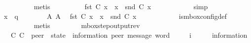 \begin{isabellebody}
\ \ \ \ \ \ \ \ \isamarkupfalse%
\ metis\isanewline
\ \ \ \ \ \ \isamarkupfalse%
\ \isamarkupfalse%
\ {\isachardoublequoteopen}fst\ {\isacharparenleft}{\kern0pt}C{}\ x{\isacharparenright}{\kern0pt}\ {\isasymin}\ {\isasymS}{\isacharparenleft}{\kern0pt}x{\isacharparenright}{\kern0pt}\ {\isasymand}\ snd\ {\isacharparenleft}{\kern0pt}C{}\ x{\isacharparenright}{\kern0pt}\ {\isasymin}\ {\isasymM}\isactrlsup {\isacharasterisk}{\kern0pt}{\isachardoublequoteclose}\isanewline
\ \ \ \ \ \ \ \ \isamarkupfalse%
\ simp\isanewline
\ \ \ \ \isamarkupfalse%
\isanewline
\ \ \ \ \ \ \isamarkupfalse%
\ {\isachardoublequoteopen}x\ {\isasymnoteq}\ q{\isachardoublequoteclose}\isanewline
\ \ \ \ \ \ \isamarkupfalse%
\ A{}\ A{}\ \isamarkupfalse%
\ {\isachardoublequoteopen}fst\ {\isacharparenleft}{\kern0pt}C{}\ x{\isacharparenright}{\kern0pt}\ {\isasymin}\ {\isasymS}{\isacharparenleft}{\kern0pt}x{\isacharparenright}{\kern0pt}\ {\isasymand}\ snd\ {\isacharparenleft}{\kern0pt}C{}\ x{\isacharparenright}{\kern0pt}\ {\isasymin}\ {\isasymM}\isactrlsup {\isacharasterisk}{\kern0pt}{\isachardoublequoteclose}\isanewline
\ \ \ \ \ \ \ \ \isamarkupfalse%
\ is{\isacharunderscore}{\kern0pt}mbox{\isacharunderscore}{\kern0pt}config{\isacharunderscore}{\kern0pt}def\isanewline
\ \ \ \ \ \ \ \ \isamarkupfalse%
\ metis\isanewline
\ \ \ \ \isamarkupfalse%
\isanewline
\ \ \isamarkupfalse%
\isanewline
{}\isamarkupfalse%
%
\endisatagproof
{\isafoldproof}%
%
\isadelimproof
\isanewline
%
\endisadelimproof
\isanewline
{}\isamarkupfalse%
\ mbox{\isacharunderscore}{\kern0pt}step{\isacharunderscore}{\kern0pt}output{\isacharunderscore}{\kern0pt}rev{\isacharcolon}{\kern0pt}\isanewline
\ \ \ C{}\ C{}\ {\isacharcolon}{\kern0pt}{\isacharcolon}{\kern0pt}\ {\isachardoublequoteopen}{\isacharprime}{\kern0pt}peer\ {\isasymRightarrow}\ {\isacharparenleft}{\kern0pt}{\isacharprime}{\kern0pt}state\ {\isasymtimes}\ {\isacharparenleft}{\kern0pt}{\isacharprime}{\kern0pt}information{\isacharcomma}{\kern0pt}\ {\isacharprime}{\kern0pt}peer{\isacharparenright}{\kern0pt}\ message\ word{\isacharparenright}{\kern0pt}{\isachardoublequoteclose}\isanewline
\ \ \ \ \ i\ \ \ \ \ {\isacharcolon}{\kern0pt}{\isacharcolon}{\kern0pt}\ {\isachardoublequoteopen}{\isacharprime}{\kern0pt}information{\isachardoublequoteclose}\isanewline

\end{isabellebody}
